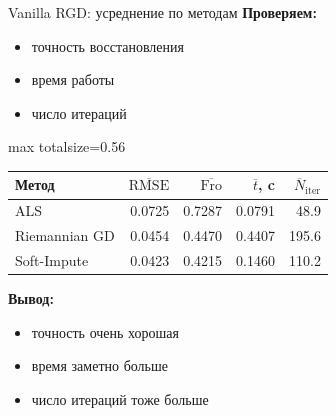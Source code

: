 \documentclass[aspectratio=169,xcolor=dvipsnames]{beamer}
\begin{document}
\begin{frame}{Vanilla RGD: усреднение по методам}
\small
\textbf{Проверяем:}
\begin{itemize}
\item точность восстановления
\item время работы
\item число итераций
\end{itemize}

\begin{center}
\begin{adjustbox}{max totalsize={\textwidth}{0.56\textheight}}
\begin{tabular}{lrrrr}
\toprule
Метод & $\overline{\mathrm{RMSE}}$ & $\overline{\text{Fro}}$ & $\overline{t}$, c & $\overline{N}_{\mathrm{iter}}$ \\
\midrule
ALS & 0.0725 & 0.7287 & 0.0791 & 48.9 \\
Riemannian GD & 0.0454 & 0.4470 & 0.4407 & 195.6 \\
Soft-Impute & 0.0423 & 0.4215 & 0.1460 & 110.2 \\
\bottomrule
\end{tabular}
\end{adjustbox}
\end{center}

\textbf{Вывод:}
\begin{itemize}
\item точность очень хорошая
\item время заметно больше
\item число итераций тоже больше
\end{itemize}
\end{frame}
\end{document}
